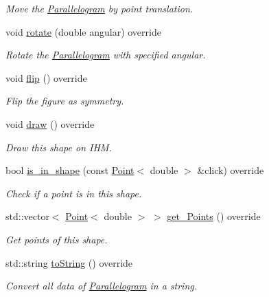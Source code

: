 \begin{DoxyCompactItemize}
\begin{DoxyCompactList}\small\item\em Move the \hyperlink{classParallelogram}{Parallelogram} by point translation. \end{DoxyCompactList}\item 
void \hyperlink{classParallelogram_ac498f6a15dea236ecc49bece023d17b0}{rotate} (double angular) override
\begin{DoxyCompactList}\small\item\em Rotate the \hyperlink{classParallelogram}{Parallelogram} with specified angular. \end{DoxyCompactList}\item 
\mbox{\label{classParallelogram_a51f002e90b7bf6c5d875cc094c22f7c1}} 
void \hyperlink{classParallelogram_a51f002e90b7bf6c5d875cc094c22f7c1}{flip} () override
\begin{DoxyCompactList}\small\item\em Flip the figure as symmetry. \end{DoxyCompactList}\item 
\mbox{\label{classParallelogram_a73e3657bf024787b57ccdd8035a6fdef}} 
void \hyperlink{classParallelogram_a73e3657bf024787b57ccdd8035a6fdef}{draw} () override
\begin{DoxyCompactList}\small\item\em Draw this shape on I\+HM. \end{DoxyCompactList}\item 
bool \hyperlink{classParallelogram_a585b14ca0f65ed3a5007e8c1df3c6bc4}{is\+\_\+in\+\_\+shape} (const \hyperlink{classPoint}{Point}$<$ double $>$ \&click) override
\begin{DoxyCompactList}\small\item\em Check if a point is in this shape. \end{DoxyCompactList}\item 
std\+::vector$<$ \hyperlink{classPoint}{Point}$<$ double $>$ $>$ \hyperlink{classParallelogram_a17c9986712806a8b07d90e444e0a543d}{get\+\_\+\+Points} () override
\begin{DoxyCompactList}\small\item\em Get points of this shape. \end{DoxyCompactList}\item 
std\+::string \hyperlink{classParallelogram_a9caae0044f23d8a1e87b1a78d852c37f}{to\+String} () override
\begin{DoxyCompactList}\small\item\em Convert all data of \hyperlink{classParallelogram}{Parallelogram} in a string. \end{DoxyCompactList}\end{DoxyCompactItemize}


